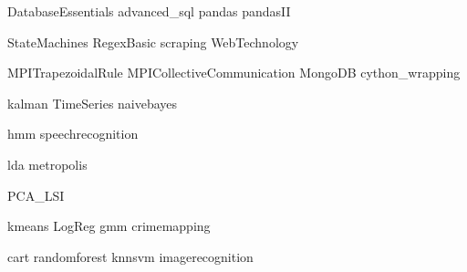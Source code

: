 \documentclass[nociteref]{SIAM-GH-book}
\begin{document}
{DatabaseEssentials}
{advanced_sql}
{pandas}
{pandasII}

{StateMachines}
{RegexBasic}
{scraping}
{WebTechnology}

{MPITrapezoidalRule}
{MPICollectiveCommunication}
{MongoDB}
{cython_wrapping}

{kalman}
{TimeSeries}
{naivebayes}

{hmm}
{speechrecognition}

{lda}
{metropolis}

{PCA_LSI}

{kmeans}
{LogReg}
{gmm}
{crimemapping}

{cart}
{randomforest}
{knnsvm}
{imagerecognition}
\end{document}
